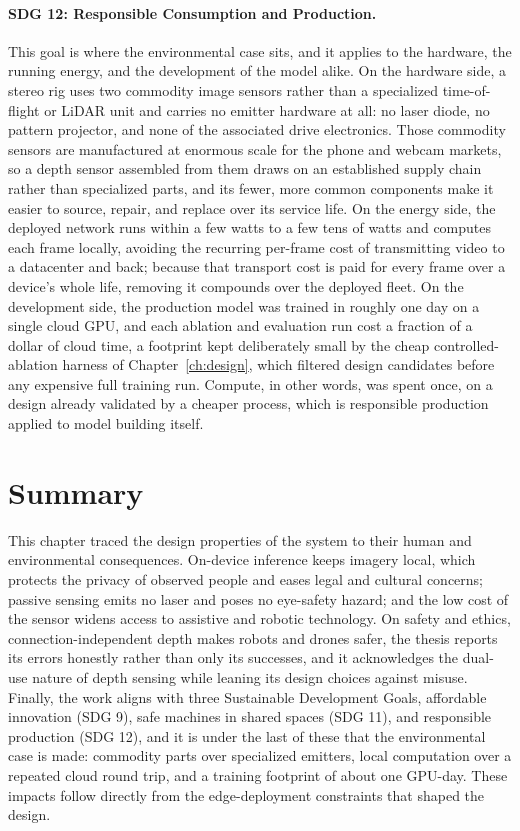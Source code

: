 \paragraph{SDG 12: Responsible Consumption and Production.}
This goal is where the environmental case sits, and it applies to the
hardware, the running energy, and the development of the model alike. On
the hardware side, a stereo rig uses two commodity image sensors rather
than a specialized time-of-flight or LiDAR unit and carries no emitter
hardware at all: no laser diode, no pattern projector, and none of the
associated drive electronics. Those commodity sensors are manufactured at
enormous scale for the phone and webcam markets, so a depth sensor
assembled from them draws on an established supply chain rather than
specialized parts, and its fewer, more common components make it easier
to source, repair, and replace over its service life. On the energy side,
the deployed network runs within a few watts to a few tens of watts and
computes each frame locally, avoiding the recurring per-frame cost of
transmitting video to a datacenter and back; because that transport cost
is paid for every frame over a device's whole life, removing it compounds
over the deployed fleet. On the development side, the production model was
trained in roughly one day on a single cloud GPU, and each ablation and
evaluation run cost a fraction of a dollar of cloud time, a footprint
kept deliberately small by the cheap controlled-ablation harness of
Chapter~\ref{ch:design}, which filtered design candidates before any
expensive full training run. Compute, in other words, was spent once, on
a design already validated by a cheaper process, which is responsible
production applied to model building itself.

\FloatBarrier
\section{Summary}
\label{sec:soc_summary}
This chapter traced the design properties of the system to their human
and environmental consequences. On-device inference keeps imagery local,
which protects the privacy of observed people and eases legal and
cultural concerns; passive sensing emits no laser and poses no eye-safety
hazard; and the low cost of the sensor widens access to assistive and
robotic technology. On safety and ethics, connection-independent depth
makes robots and drones safer, the thesis reports its errors honestly
rather than only its successes, and it acknowledges the dual-use nature
of depth sensing while leaning its design choices against misuse.
Finally, the work aligns with three Sustainable Development Goals,
affordable innovation (SDG 9), safe machines in shared spaces (SDG 11),
and responsible production (SDG 12), and it is under the last of these
that the environmental case is made: commodity parts over specialized
emitters, local computation over a repeated cloud round trip, and a
training footprint of about one GPU-day. These impacts follow directly
from the edge-deployment constraints that shaped the design.


